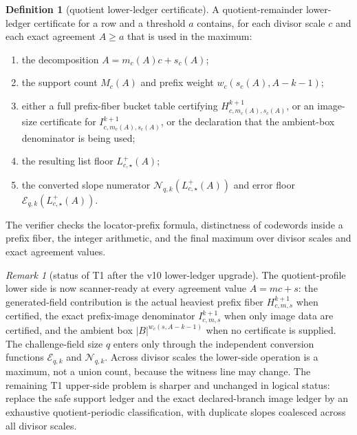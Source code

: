 \documentclass[11pt]{article}
\theoremstyle{definition}
\newtheorem{definition}[theorem]{Definition}
\theoremstyle{remark}
\newtheorem{remark}[theorem]{Remark}
\newcommand{\B}{B}
\begin{document}
\begin{definition}[quotient lower-ledger certificate]
\label{def:quotient-lower-ledger-certificate}
A quotient-remainder lower-ledger certificate for a row and a threshold $a$
contains, for each divisor scale $c$ and each exact agreement $A\ge a$ that is
used in the maximum:
\begin{enumerate}[label=\textup{(\roman*)},leftmargin=2.2em]
\item the decomposition $A=m_c(A)c+s_c(A)$;
\item the support count $M_c(A)$ and prefix weight $w_c(s_c(A),A-k-1)$;
\item either a full prefix-fiber bucket table certifying
$H_{c,m_c(A),s_c(A)}^{k+1}$, or an image-size certificate for
$I_{c,m_c(A),s_c(A)}^{k+1}$, or the declaration that the ambient-box denominator
is being used;
\item the resulting list floor $L_{c,\star}^+(A)$;
\item the converted slope numerator
$\mathcal N_{q,k}(L_{c,\star}^+(A))$ and error floor
$\mathcal E_{q,k}(L_{c,\star}^+(A))$.
\end{enumerate}
The verifier checks the locator-prefix formula, distinctness of codewords inside
a prefix fiber, the integer arithmetic, and the final maximum over divisor
scales and exact agreement values.
\end{definition}

\begin{remark}[status of T1 after the v10 lower-ledger upgrade]
\label{rem:T1-lower-ledger-status-v10}
The quotient-profile lower side is now scanner-ready at every agreement value
$A=mc+s$: the generated-field contribution is the actual heaviest prefix fiber
$H_{c,m,s}^{k+1}$ when certified, the exact prefix-image denominator
$I_{c,m,s}^{k+1}$ when only image data are certified, and the ambient box
$|\B|^{w_c(s,A-k-1)}$ when no certificate is supplied.  The challenge-field size
$q$ enters only through the independent conversion functions
$\mathcal E_{q,k}$ and $\mathcal N_{q,k}$.  Across divisor scales the lower-side
operation is a maximum, not a union count, because the witness line may change.
The remaining T1 upper-side problem is sharper and unchanged in logical status:
replace the safe support ledger and the exact declared-branch image ledger by an
exhaustive quotient-periodic classification, with duplicate slopes coalesced
across all divisor scales.
\end{remark}
\end{document}
